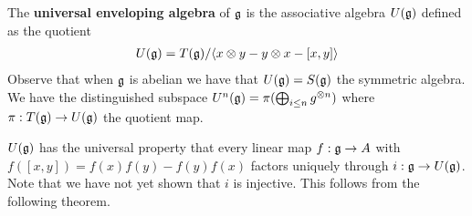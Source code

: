\documentclass[12pt]{article}
\begin{document}
\begin{definition}
The \textbf{universal enveloping algebra} of $\mathfrak{g}$ is the associative algebra $U(\mathfrak{g})$ defined as the quotient \begin{align*}
    U(\mathfrak{g}) = T(\mathfrak{g}) / \langle x\otimes y - y\otimes x - [x,y]\rangle
\end{align*} Observe that when $\mathfrak{g}$ is abelian we have that $U(\mathfrak{g})  = S(\mathfrak{g})$ the symmetric algebra. We have the distinguished subspace $U^n(\mathfrak{g}) = \pi(\bigoplus_{i\leq n}g^{\otimes n})$ where $\pi:T(\mathfrak{g})\to U(\mathfrak{g})$ the quotient map. 
\end{definition}
\hfill 

$U(\mathfrak{g})$ has the universal property that every linear map $f:\mathfrak{g}\to A$ with $f([x,y]) = f(x)f(y) - f(y)f(x)$ factors uniquely through $i:\mathfrak{g}\to U(\mathfrak{g})$. Note that we have not yet shown that $i$ is injective. This follows from the following theorem.
\end{document}
